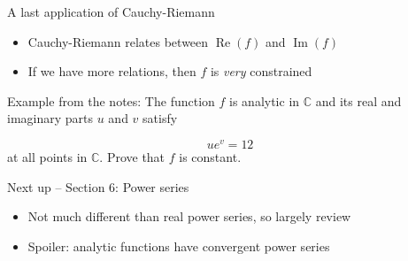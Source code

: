 \documentclass{beamer}
\newcommand{\C}{\mathbb{C}}
\DeclareMathOperator{\Real}{Re}
\DeclareMathOperator{\Imag}{Im}
\begin{document}
\begin{frame}{A last application of Cauchy-Riemann}

\begin{itemize}
    \item Cauchy-Riemann relates between $\Real(f)$ and $\Imag(f)$
    \item If we have more relations, then $f$ is \emph{very} constrained
\end{itemize}

\begin{block}{Example from the notes:}
The function $f$ is analytic in $\C$ and its real and imaginary parts $u$ and $v$ satisfy 

$$ue^v=12$$ 
at all points in $\C$.  Prove that $f$ is constant.
\end{block}

\begin{block}{Next up -- Section 6: Power series}
\begin{itemize}
\item Not much different than real power series, so largely review
\item Spoiler: analytic functions have convergent power series 
\end{itemize}
\end{block}
\end{frame}
\end{document}
